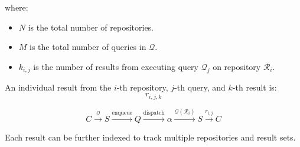 \documentclass[11pt]{article}
\begin{document}
where:
\begin{itemize}
    \item \(N\) is the total number of repositories.
    \item \(M\) is the total number of queries in \(\mathcal{Q}\).
    \item \(k_{i,j}\) is the number of results from executing query
      \(\mathcal{Q}_j\)
      on repository \(\mathcal{R}_i\).
\end{itemize}

An individual result from the \(i\)-th repository, \(j\)-th query, and \(k\)-th result is:
\[
    r_{i,j,k}
\]



\[
    C \xrightarrow{\mathcal{Q}} S \xrightarrow{\text{enqueue}} Q \xrightarrow{\text{dispatch}} \alpha \xrightarrow{\mathcal{Q}(\mathcal{R}_i)} S \xrightarrow{r_{i,j}} C
\]

Each result can be further indexed to track multiple repositories and result sets.
\end{document}
